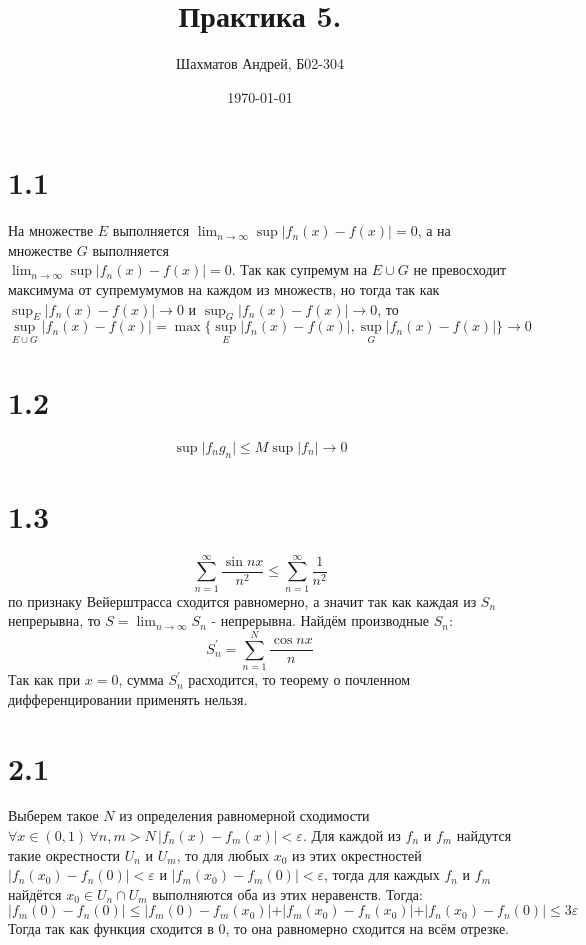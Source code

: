 \documentclass[12pt]{article}
\title{Практика 5.}
\author{Шахматов Андрей, Б02-304}
\date{\today}
\begin{document}
\maketitle
\tableofcontents

\section{1.1}
На множестве $E$ выполняется $\lim_{n \to \infty} \sup \vert f_n(x) - f(x) \vert  = 0$, а 
на множестве $G$ выполняется \\ $\lim_{n \to \infty} \sup \vert f_n(x) - f(x) \vert  = 0$. Так как
супремум на $E \cup G$ не превосходит максимума от супремумумов на каждом из множеств, но тогда 
так как $\sup_E \vert f_n(x) - f(x) \vert  \to 0$ и $\sup_G \vert f_n(x) - f(x) \vert  \to 0$, то
\[
    \sup_{E \cup G} \vert f_n(x) - f(x) \vert  = \max \{ \sup_E \vert f_n(x) - f(x) \vert , \sup_G \vert f_n(x) - f(x) \vert \} \to 0
\] 
\section{1.2}
\[
    \sup \vert f_n g_n \vert \leq M \sup \vert f_n \vert \to 0 
\]  
\section{1.3}
\[
    \sum_{n=1}^{\infty} \frac{\sin nx}{n^2} \leq \sum_{n=1}^{\infty} \frac{1}{n^2}
\]
по признаку Вейерштрасса сходится равномерно, а значит так как каждая из $S_n$ непрерывна, то $S = \lim_{n \to \infty} S_n$ - непрерывна. 
Найдём производные $S_n$:
\[
    S_n^{\prime} = \sum_{n=1}^{N} \frac{\cos nx}{n} 
\]
Так как при $x = 0$, сумма $S_n^{\prime}$ расходится, то теорему о почленном дифференцировании применять нельзя.  
\section{2.1}
Выберем такое $N$ из определения равномерной сходимости $\forall x \in (0, 1) \, \forall n, m > N \, \vert f_n(x) - f_m(x) \vert < \varepsilon$. 
Для каждой из $f_n$ и $f_m$ найдутся такие окрестности $U_n$ и $U_m$, то для любых $x_0$ из этих окрестностей 
$\vert f_n(x_0) - f_n(0) \vert < \varepsilon$ и $\vert f_m(x_0) - f_m(0) \vert < \varepsilon$, тогда для каждых $f_n$ и $f_m$ найдётся 
$x_0 \in U_n \cap U_m$ выполняются оба из этих неравенств. Тогда: 
\[
    \vert f_m(0) - f_n(0) \vert \leq \vert f_m(0) - f_m(x_0) \vert + 
    \vert f_m(x_0) - f_n(x_0) \vert + 
    \vert f_n(x_0) - f_n(0) \vert \leq 3 \varepsilon
\]      
Тогда так как функция сходится в 0, то она равномерно сходится на всём отрезке. 
\end{document}
